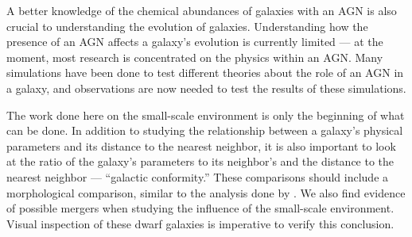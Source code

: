 A better knowledge of the chemical abundances of galaxies with an AGN is also 
crucial to understanding the evolution of galaxies.  Understanding how the 
presence of an AGN affects a galaxy's evolution is currently limited --- at the 
moment, most research is concentrated on the physics within an AGN.  Many 
simulations have been done to test different theories about the role of an AGN 
in a galaxy, and observations are now needed to test the results of these 
simulations.


The work done here on the small-scale environment is only the beginning of what 
can be done.  In addition to studying the relationship between a galaxy's 
physical parameters and its distance to the nearest neighbor, it is also 
important to look at the ratio of the galaxy's parameters to its neighbor's and 
the distance to the nearest neighbor --- ``galactic conformity.''  These 
comparisons should include a morphological comparison, similar to the analysis 
done by \cite{Park09}.  We also find evidence of possible mergers when studying 
the influence of the small-scale environment.  Visual inspection of these dwarf 
galaxies is imperative to verify this conclusion.